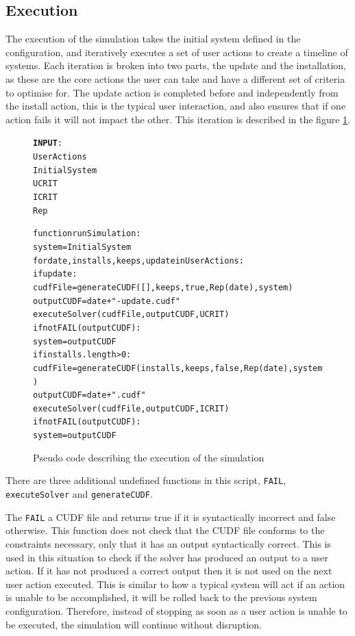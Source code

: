 \subsection{Execution}
The execution of the simulation takes the initial system defined in the configuration, and iteratively executes a set of user actions to create a timeline of systems.
Each iteration is broken into two parts, the update and the installation, as these are the core actions the user can take and have a different set of criteria to optimise for.
The update action is completed before and independently from the install action, this is the typical user interaction, and also ensures that if one action fails it will not impact the other.
This iteration is described in the figure \ref{executeSimulation}.

\begin{figure}[htp]
\begin{center}
\begin{alltt}
\textbf{INPUT}:
UserActions
InitialSystem
UCRIT
ICRIT
Rep

function runSimulation:
    system = InitialSystem
    for date,installs,keeps,update in UserActions:
        if update:
            cudfFile = generateCUDF([],keeps,true,Rep(date),system)        
            outputCUDF  = date + "-update.cudf"
            executeSolver(cudfFile, outputCUDF, UCRIT)
            if not FAIL(outputCUDF):
                system = outputCUDF
        if installs.length > 0:
            cudfFile = generateCUDF(installs,keeps,false,Rep(date),system)        
            outputCUDF  = date + ".cudf"
            executeSolver(cudfFile, outputCUDF, ICRIT)
            if not FAIL(outputCUDF):
                system = outputCUDF
            
\end{alltt}
\caption[Execute Simulation]{Pseudo code describing the execution of the simulation}
\label{executeSimulation}
\end{center}
\end{figure}

There are three additional undefined functions in this script, \verb+FAIL+, \verb+executeSolver+ and \verb+generateCUDF+.

The \verb+FAIL+ a CUDF file and returns true if it is syntactically incorrect and false otherwise.
This function does not check that the CUDF file conforms to the constraints necessary, only that it has an output syntactically correct.
This is used in this situation to check if the solver has produced an output to a user action.
If it has not produced a correct output then it is not used on the next user action executed. 
This is similar to how a typical system will act if an action is unable to be accomplished, it will be rolled back to the previous system configuration.
Therefore, instead of stopping as soon as a user action is unable to be executed, the simulation will continue without disruption.


